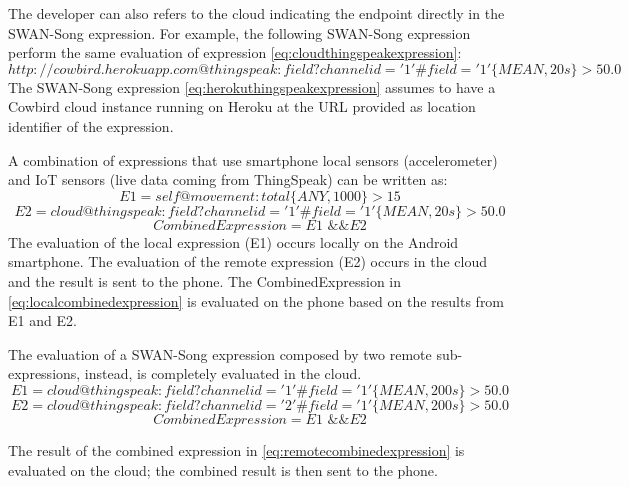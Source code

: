 The developer can also refers to the cloud indicating the endpoint directly in the SWAN-Song expression. For example, the following SWAN-Song expression perform the same evaluation of expression \ref{eq:cloudthingspeakexpression}:
\begin{dmath} \label{eq:herokuthingspeakexpression}
http://cowbird.herokuapp.com@thingspeak: field?channelid='1'\#field='1'\big\{MEAN,20s\big\} > 50.0
\end{dmath}
The SWAN-Song expression \ref{eq:herokuthingspeakexpression} assumes to have a Cowbird cloud instance running on Heroku at the URL provided as location identifier of the expression.

A combination of expressions that use smartphone local sensors (accelerometer) and IoT sensors (live data coming from ThingSpeak) can be written as:
\begin{equation}
E1 = self@movement:total\big\{ANY,1000\big\} > 15 
\end{equation}
\begin{equation}
E2 = cloud@thingspeak:field?channelid='1'\#field='1'\big\{MEAN,20s\big\} > 50.0
\end{equation}
\begin{equation} \label{eq:localcombinedexpression}
CombinedExpression = E1 \text{ \&\& } E2
\end{equation}
The evaluation of the local expression (E1) occurs locally on the Android smartphone. The evaluation of the remote expression (E2) occurs in the cloud and the result is sent to the phone. The CombinedExpression in \ref{eq:localcombinedexpression} is evaluated on the phone based on the results from E1 and E2. 

The evaluation of a SWAN-Song expression composed by two remote sub-expressions, instead, is completely evaluated in the cloud.
\begin{equation}
E1 = cloud@thingspeak:field?channelid='1' \#field='1'\big\{MEAN,200s\big\} > 50.0
\end{equation}
\begin{equation}
E2 = cloud@thingspeak:field?channelid='2' \#field='1'\big\{MEAN,200s\big\} > 50.0
\end{equation}
\begin{equation} \label{eq:remotecombinedexpression}
CombinedExpression = E1 \text{ \&\& } E2
\end{equation}

The result of the combined expression in \ref{eq:remotecombinedexpression} is evaluated on the cloud; the combined result is then sent to the phone.
